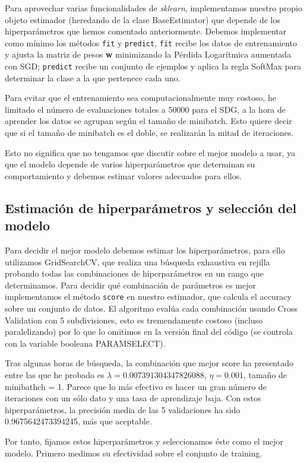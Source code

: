 \documentclass[a4]{article}
\begin{document}
Para aprovechar varias funcionalidades de \textit{sklearn},
implementamos nuestro propio objeto estimador (heredando de la clase
BaseEstimator) que depende de los hiperparámetros que hemos comentado
anteriormente. Debemos implementar como mínimo los métodos
\texttt{fit} y \texttt{predict}, \texttt{fit} recibe los datos de
entrenamiento y ajusta la matriz de pesos \textbf{w} minimizando la
Pérdida Logarítmica aumentada con SGD; \texttt{predict} recibe un
conjunto de ejemplos y aplica la regla SoftMax para determinar la
clase a la que pertenece cada uno.

Para evitar que el entrenamiento sea computacionalmente muy costoso,
he limitado el número de evaluaciones totales a 50000 para el SDG, a
la hora de aprender los datos se agrupan según el tamaño de
minibatch. Esto quiere decir que si el tamaño de minibatch es el
doble, se realizarán la mitad de iteraciones.

Esto no significa que no tengamos que discutir sobre el mejor modelo a
usar, ya que el modelo depende de varios hiperparámetros que
determinan su comportamiento y debemos estimar valores adecuados para
ellos.

\subsection{Estimación de hiperparámetros y selección del modelo}

Para decidir el mejor modelo debemos estimar los hiperparámetros, para
ello utilizamos GridSearchCV, que realiza una búsqueda exhaustiva en
rejilla probando todas las combinaciones de hiperparámetros en un
rango que determinamos. Para decidir qué combinación de parámetros es
mejor implementamos el método \texttt{score} en nuestro estimador, que
calcula el accuracy sobre un conjunto de datos. El algoritmo evalúa
cada combinación usando Cross Validation con 5 subdivisiones, esto es
tremendamente costoso (incluso paralelizando) por lo que lo omitimos
en la versión final del código (se controla con la variable booleana
PARAMSELECT).

Tras algunas horas de búsqueda, la combinación que mejor score ha
presentado entre las que he probado es $\lambda=0.007391304347826088$,
$\eta=0.001$, tamaño de minibathch = 1. Parece que lo más efectivo es
hacer un gran número de iteraciones con un sólo dato y una tasa de
aprendizaje baja. Con estos hiperparámetros, la precisión media de las
5 validaciones ha sido 0.9675642473394245, más que aceptable.

Por tanto, fijamos estos hiperparámetros y seleccionamos éste como el
mejor modelo. Primero medimos su efectividad sobre el conjunto de
training.
\end{document}
